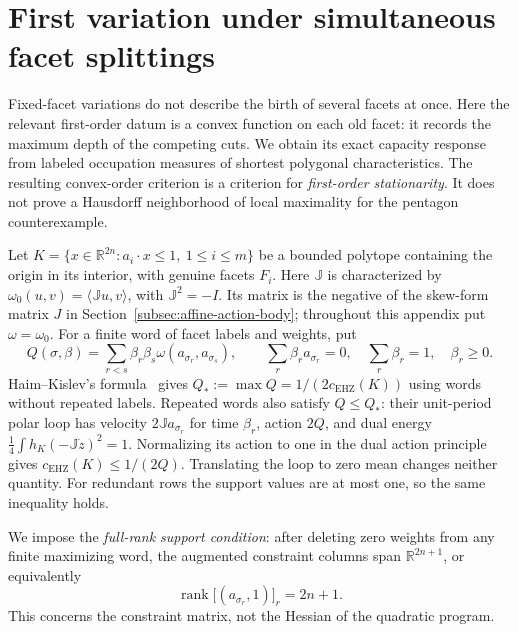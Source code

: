 \section{First variation under simultaneous facet splittings}
\label{sec:multicut-variation}

Fixed-facet variations do not describe the birth of several facets at once.
Here the relevant first-order datum is a convex function on each old facet:
it records the maximum depth of the competing cuts. We obtain its exact
capacity response from labeled occupation measures of shortest polygonal
characteristics. The resulting convex-order criterion is a criterion for
\emph{first-order stationarity}. It does not prove a Hausdorff neighborhood
of local maximality for the pentagon counterexample.

Let $K=\{x\in\mathbb R^{2n}:a_i\cdot x\leq1,\ 1\leq i\leq m\}$
be a bounded polytope containing the origin in its interior, with genuine
facets $F_i$. Here $\mathbb{J}$ is characterized by
$\omega_0(u,v)=\langle\mathbb{J}u,v\rangle$, with $\mathbb{J}^2=-I$.
Its matrix is the negative of the skew-form matrix $J$ in
Section~\ref{subsec:affine-action-body}; throughout this appendix put
$\omega=\omega_0$.
For a finite word of facet labels and weights, put
\begin{equation}\label{eq:mc-word}
 Q(\sigma,\beta)=\sum_{r<s}\beta_r\beta_s
 \omega(a_{\sigma_r},a_{\sigma_s}),\qquad
 \sum_r\beta_ra_{\sigma_r}=0,\quad
 \sum_r\beta_r=1,\quad\beta_r\geq0.
\end{equation}
Haim--Kislev's formula~\cite{HK2017} gives
$Q_*:=\max Q=1/(2c_{\mathrm{EHZ}}(K))$ using words without repeated labels.
Repeated words also satisfy $Q\leq Q_*$: their unit-period polar loop has
velocity $2\mathbb{J}a_{\sigma_r}$ for time $\beta_r$, action $2Q$, and dual energy
$\frac14\int h_K(-\mathbb{J}\dot z)^2=1$. Normalizing its action to one in the dual
action principle gives $c_{\mathrm{EHZ}}(K)\leq1/(2Q)$. Translating the loop
to zero mean changes neither quantity. For redundant rows the support values
are at most one, so the same inequality holds.

We impose the \emph{full-rank support condition}: after deleting
zero weights from any finite maximizing word, the augmented constraint
columns span $\mathbb R^{2n+1}$, or equivalently
\[
 \operatorname{rank}\bigl[(a_{\sigma_r},1)\bigr]_r=2n+1.
\]
This concerns the constraint matrix, not the Hessian of the quadratic program.

